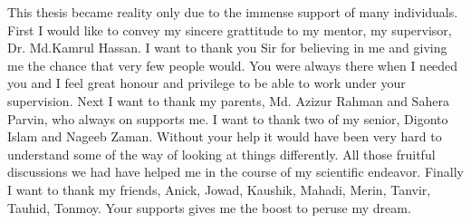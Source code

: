
\begin{acknowledgements}      
	This thesis became reality only due to the immense support of many individuals. First I would like to convey my sincere grattitude to my mentor, my supervisor, Dr. Md.Kamrul Hassan. I want to thank you Sir for believing in me and giving me the chance that very few people would. You were always there when I needed you and I feel great honour and privilege to be able to work under your supervision. Next I want to thank my parents, Md. Azizur Rahman and Sahera Parvin, who always on supports me. I want to thank two of my senior, Digonto Islam and Nageeb Zaman. Without your help it would have been very hard to understand some of the way of looking at things differently. All those fruitful discussions we had have helped me in the course of my scientific endeavor. Finally I want to thank my friends, Anick, Jowad, Kaushik, Mahadi, Merin, Tanvir, Tauhid, Tonmoy. Your supports gives me the boost to peruse my dream.
\end{acknowledgements}

